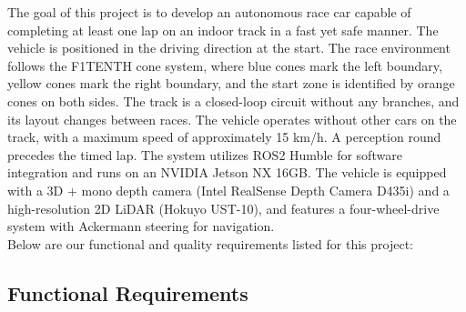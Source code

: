 The goal of this project is to develop an autonomous race car capable of completing at least one lap on an indoor track in a fast yet safe manner.
The vehicle is positioned in the driving direction at the start. The race environment follows the F1TENTH cone system, where blue cones mark the left boundary, yellow cones mark the right boundary, and the start zone is identified by orange cones on both sides.
The track is a closed-loop circuit without any branches, and its layout changes between races. The vehicle operates without other cars on the track, with a maximum speed of approximately 15 km/h. 
A perception round precedes the timed lap. The system utilizes ROS2 Humble for software integration and runs on an NVIDIA Jetson NX 16GB. The vehicle is equipped with a 3D + mono depth camera (Intel RealSense Depth Camera D435i) and a high-resolution 2D LiDAR (Hokuyo UST-10), and features a four-wheel-drive system with Ackermann steering for navigation.\\
\newline
Below are our functional and quality requirements listed for this project:
\subsection{Functional Requirements}

